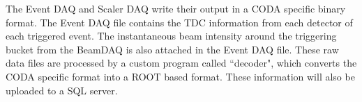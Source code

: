 \documentclass[../main.tex]{subfiles}
\begin{document}
The Event DAQ and Scaler DAQ write their output in a CODA specific binary format. The Event
DAQ file contains the TDC information from each detector of each triggered event. The instantaneous
beam intensity around the triggering bucket from the BeamDAQ is also attached in the Event DAQ file.
These raw data files are processed by a custom program called ``decoder", which converts the
CODA specific format into a ROOT based format. These information will also be uploaded to a SQL
server.

\ifSubfilesClassLoaded{ \printbibliography[heading=bibintoc,title={References}]}{}
\end{document}
